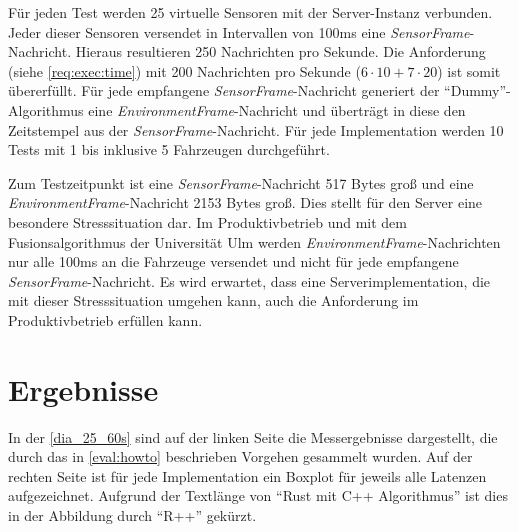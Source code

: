 Für jeden Test werden 25 virtuelle Sensoren mit der Server-Instanz verbunden.
Jeder dieser Sensoren versendet in Intervallen von 100ms eine \textit{SensorFrame}-Nachricht.
Hieraus resultieren 250 Nachrichten pro Sekunde.
Die Anforderung  (siehe \autoref{req:exec:time}) mit 200 Nachrichten pro Sekunde ($6 \cdot 10 + 7 \cdot 20$) ist somit übererfüllt.
Für jede empfangene \textit{SensorFrame}-Nachricht generiert der \enquote{Dummy}-Algorithmus eine \textit{EnvironmentFrame}-Nachricht und überträgt in diese den Zeitstempel aus der \textit{SensorFrame}-Nachricht.
Für jede Implementation werden 10 Tests mit 1 bis inklusive 5 Fahrzeugen durchgeführt.

Zum Testzeitpunkt ist eine \textit{SensorFrame}-Nachricht 517 Bytes groß und eine \textit{EnvironmentFrame}-Nachricht 2153 Bytes groß.
Dies stellt für den Server eine besondere Stresssituation dar.
Im Produktivbetrieb und mit dem Fusionsalgorithmus der Universität Ulm werden \textit{EnvironmentFrame}-Nachrichten nur alle 100ms an die Fahrzeuge versendet und nicht für jede empfangene \textit{SensorFrame}-Nachricht.
Es wird erwartet, dass eine Serverimplementation, die mit dieser Stresssituation umgehen kann, auch die Anforderung  im Produktivbetrieb erfüllen kann.

\section{Ergebnisse}
\label{eval:results}

In der \autoref{dia_25_60s} sind auf der linken Seite die Messergebnisse dargestellt, die durch das in \autoref{eval:howto} beschrieben Vorgehen gesammelt wurden.
Auf der rechten Seite ist für jede Implementation ein Boxplot für jeweils alle Latenzen aufgezeichnet.
Aufgrund der Textlänge von \enquote{Rust mit C++ Algorithmus} ist dies in der Abbildung durch \enquote{R++} gekürzt.


